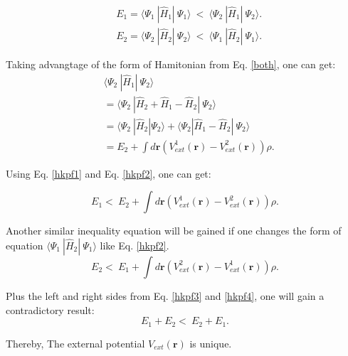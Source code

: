 \documentclass[a4paper, 12pt, titlepage,oneside,drop]{kthesis}
\begin{document}
\begin{equation}\label{hkpf1}\begin{split}
&  E_1 = \langle \Psi_1\ |\hat{H}_{1}|\ \Psi_1 \rangle  \ < \  \langle \Psi_2\ |\hat{H}_{1}|\ \Psi_2 \rangle.\\
&  E_2 = \langle \Psi_2\ |\hat{H}_{2}|\ \Psi_2 \rangle  \ < \  \langle \Psi_1\ |\hat{H}_{2}|\ \Psi_1 \rangle.
\end{split}\end{equation}

\noindent Taking advangtage of the form of Hamitonian from Eq. \ref{both}, one can get:
\begin{equation}\label{hkpf2}\begin{split}
&    \langle \Psi_2\ |\hat{H}_{1}|\ \Psi_2 \rangle \\
&  = \langle \Psi_2\ |\hat{H}_{2} + \hat{H}_{1} - \hat{H}_{2}|\ \Psi_2 \rangle \\
&  = \langle \Psi_2\ |\hat{H}_{2} |\Psi_2 \rangle + \langle \Psi_2 | \hat{H}_{1} - \hat{H}_{2}|\ \Psi_2 \rangle \\
&  = E_2 + \int d \textbf{r} ( V^{1}_\textit{ext}(\textbf{r}) - V^{2}_\textit{ext}(\textbf{r}) )  \rho.
\end{split}\end{equation}

\noindent Using Eq. \ref{hkpf1} and Eq. \ref{hkpf2}, one can get:

\begin{equation}\label{hkpf3}
 E_1  < \  E_2 + \int d \textbf{r} ( V^{1}_\textit{ext}(\textbf{r}) - V^{2}_\textit{ext}(\textbf{r}) )  \rho.
\end{equation}

\noindent Another similar inequality equation will be gained if one changes the form of equation $\langle \Psi_1\ |\hat{H}_{2}|\ \Psi_1 \rangle$ like Eq. \ref{hkpf2}.
\begin{equation}\label{hkpf4}
  E_2  < \  E_1 + \int d \textbf{r} ( V^{2}_\textit{ext}(\textbf{r}) - V^{1}_\textit{ext}(\textbf{r}) )  \rho.
\end{equation}

\noindent Plus the left and right sides from Eq. \ref{hkpf3} and \ref{hkpf4}, one will gain a contradictory result:
\begin{equation}\label{hkpf4}
  E_1 + E_2  < \  E_2 + E_1.
\end{equation}

\noindent Thereby, The external potential $V_\textit{ext}(\textbf{r})$ is unique.
\end{document}
